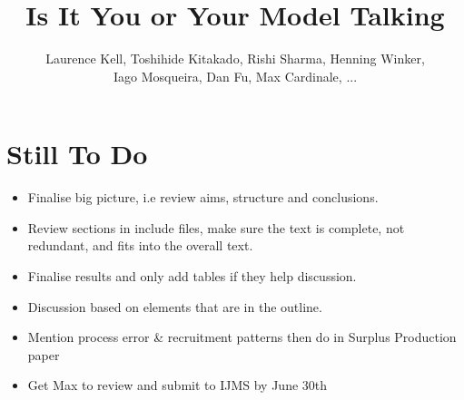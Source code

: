 \documentclass[a4paper]{article}
\title{Is It You or Your Model Talking}
\author{Laurence Kell, Toshihide Kitakado, Rishi Sharma, Henning Winker, \\ Iago Mosqueira, Dan Fu, Max Cardinale, ...}
\begin{document}
\maketitle
 
\section*{Still To Do}
\begin{itemize}
   \item Finalise big picture, i.e review aims, structure and conclusions.
   \item Review sections in include files, make sure the text is complete, not redundant,  and fits into the overall text.
   \item Finalise results and only add tables if they help discussion.
   \item Discussion based on elements that are in the outline.
   \item Mention process error \& recruitment patterns then do in Surplus Production paper  
   \item Get Max to review and submit to IJMS by June 30th
\end{itemize}
\end{document}
